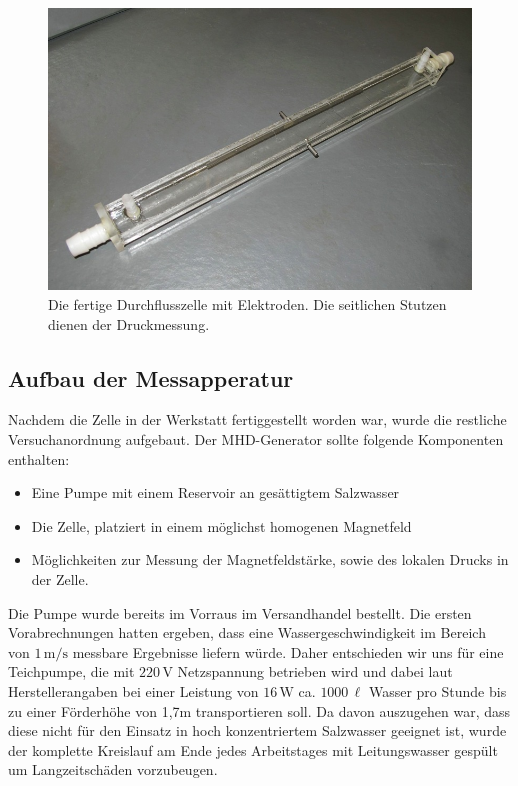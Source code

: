 \documentclass[11pt]{scrartcl}
\newcommand{\unit}[1]{\ensuremath{\,\mathrm{#1}}} %
\begin{document}
\begin{figure}[ht]
\begin{center}
\includegraphics[width=1.0\textwidth]{images/zelle-einzeln.jpg}
\end{center}
\vspace{-1.5\baselineskip}
\caption{Die fertige Durchflusszelle mit Elektroden. Die seitlichen Stutzen dienen der Druckmessung.}
\label{zelle-einzeln}
\end{figure}

\subsection{Aufbau der Messapperatur}		%
Nachdem die Zelle in der Werkstatt fertiggestellt worden war, wurde die restliche Versuchanordnung aufgebaut. Der MHD-Generator sollte folgende Komponenten enthalten:

\begin{itemize}
	\item Eine Pumpe mit einem Reservoir an ges\"attigtem Salzwasser 
	\item Die Zelle, platziert in einem m\"oglichst homogenen Magnetfeld 	
	\item M\"oglichkeiten zur Messung der Magnetfeldst\"arke, sowie des lokalen Drucks in der Zelle.
\end{itemize}

Die Pumpe wurde bereits im Vorraus im Versandhandel bestellt. Die ersten Vorabrechnungen hatten ergeben, dass eine Wassergeschwindigkeit im Bereich von $1\unit{m/s}$ messbare Ergebnisse liefern w\"urde. Daher entschieden wir uns f\"ur eine Teichpumpe, die mit $220\unit{V}$ Netzspannung betrieben wird und dabei laut Herstellerangaben bei einer Leistung von $16\unit{W}$ ca. $1000\unit{\ell}$ Wasser pro Stunde bis zu einer F\"orderh\"ohe von 1,7m transportieren soll. Da davon auszugehen war, dass diese nicht f\"ur den Einsatz in hoch konzentriertem Salzwasser geeignet ist, wurde der komplette Kreislauf am Ende jedes Arbeitstages mit Leitungswasser gesp\"ult um Langzeitsch\"aden vorzubeugen.
\end{document}
